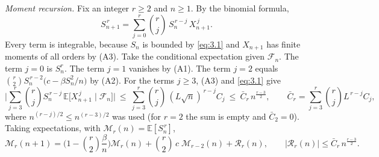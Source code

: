 \documentclass[aip,jmp,preprint,onecolumn,floatfix,superscriptaddress,nofootinbib,11pt]{revtex4-2}
\theoremstyle{plain}
\theoremstyle{remark}
\numberwithin{equation}{section}
\newcommand{\E}{\mathbb{E}}
\begin{document}
 
\textit{Moment recursion.} Fix an integer $r\ge2$ and $n\ge1$. By the binomial formula,
%
\begin{equation*}
S_{n+1}^{\,r}=\sum_{j=0}^{r}\binom rj\,S_n^{\,r-j}\,X_{n+1}^{\,j}.
\end{equation*}
%
Every term is integrable, because $S_n$ is bounded by \eqref{eq:3.1} and $X_{n+1}$ has finite moments of all orders by (A3). Take the conditional expectation given $\mathcal F_n$. The term $j=0$ is $S_n^{r}$. The term $j=1$ vanishes by (A1). The term $j=2$ equals $\binom r2 S_n^{\,r-2}\big(c-\beta S_n^{2}/n\big)$ by (A2). For the terms $j\ge3$, (A3) and \eqref{eq:3.1} give
%
\begin{equation*}
\Big|\sum_{j=3}^{r}\binom rj S_n^{\,r-j}\,\E\big[X_{n+1}^{\,j}\mid\mathcal F_n\big]\Big|\ \le\ \sum_{j=3}^{r}\binom rj\,(L\sqrt n)^{\,r-j}C_j\ \le\ \bar C_r\,n^{\frac{r-3}{2}},\qquad \bar C_r=\sum_{j=3}^{r}\binom rj L^{\,r-j}C_j ,
\end{equation*}
%
where $n^{(r-j)/2}\le n^{(r-3)/2}$ was used (for $r=2$ the sum is empty and $\bar C_2=0$). Taking expectations, with $\mathcal M_r(n)=\E[S_n^{\,r}]$,
%
\begin{equation}
\mathcal M_r(n+1)=\Big(1-\binom r2\frac{\beta}{n}\Big)\mathcal M_r(n)+\binom r2\,c\;\mathcal M_{r-2}(n)+\mathcal R_r(n),\qquad |\mathcal R_r(n)|\le \bar C_r\,n^{\frac{r-3}{2}} .
\label{eq:3.2}
\end{equation}
%
\end{document}
